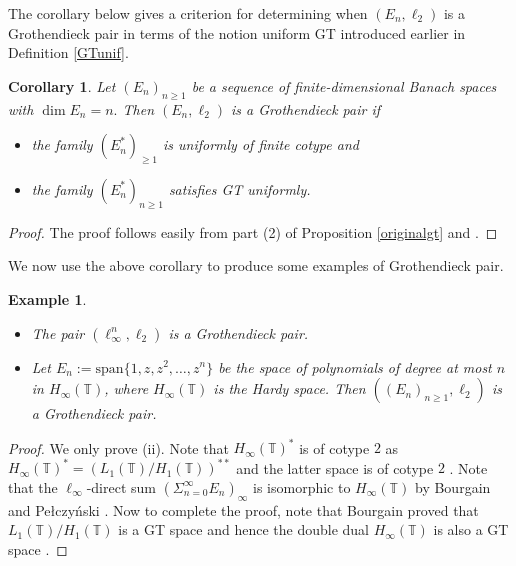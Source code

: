 \documentclass[a4paper,oneside,11pt, reqno]{amsart}
\numberwithin{equation}{section}
\newtheorem{ex}[theorem]{Example}
\newtheorem{corollary}[theorem]{Corollary}
\theoremstyle{plain}
\begin{document}
The corollary below gives a criterion for determining when $(E_n, \ell_2)$ is a Grothendieck pair in terms of the notion uniform GT introduced earlier in Definition \ref{GTunif}.
\begin{corollary}
    Let $(E_n)_{n\geqslant 1}$ be a sequence of finite-dimensional Banach spaces with $\dim E_n=n.$ Then $(E_n,\ell_2)$ is a Grothendieck pair if 
    \begin{itemize}
        \item[(i)] the family $(E_n^*)_{\geqslant 1}$ is uniformly of finite cotype and
        \item[(ii)] the family $(E_n^*)_{n\geqslant 1}$ satisfies GT uniformly.
    \end{itemize}
\end{corollary}
\begin{proof}
The proof follows easily from part (2) of Proposition \ref{originalgt} and \cite[Theorem 4.1]{Pisier-factorization}.
\end{proof}
We now use the above corollary to produce some examples of Grothendieck pair.
\begin{ex}\label{xample}
\begin{itemize}
    \item [(i)] The pair $(\ell_\infty^n,\ell_2)$ is a Grothendieck pair.
    \item[(ii)] Let $E_n:=\text{span}\{1,z,z^2,\dots,z^n\}$ be the space of polynomials of degree at most $n$ in $H_\infty(\mathbb{T})$, where $H_\infty(\mathbb{T})$ is the Hardy space. Then $((E_n)_{n\geqslant  1},\ell_2)$ is a Grothendieck pair.
\end{itemize}  
\end{ex}
\begin{proof}
    We only prove (ii). Note that $H_\infty(\mathbb{T})^*$ is of  cotype $2$ as $H_\infty(\mathbb{T})^*=(L_1(\mathbb{T})/H_1(\mathbb{T}))^{**}$ and the latter space is of cotype $2$ \cite{Pisier-factorization}. Note that the $\ell_\infty$-direct sum $(\Sigma_{n=0}^\infty E_n)_\infty$ is isomorphic to $H_\infty(\mathbb{T})$ by Bourgain and Pełczyński \cite{Bout3}. Now to complete the proof, note that Bourgain \cite{Bourgain} proved that $L_1(\mathbb{T})/H_1(\mathbb{T})$ is a GT space and hence the double dual $H_\infty(\mathbb{T})$ is also a GT space \cite[Proposition 6.2]{Pisier-factorization}.
\end{proof}
\end{document}
